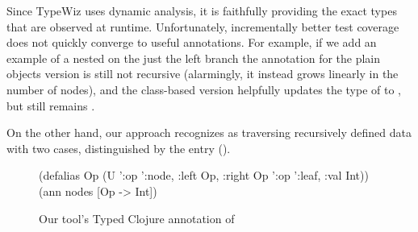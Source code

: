 Since TypeWiz uses dynamic analysis, it is faithfully
providing the exact types that are observed at runtime.
Unfortunately, incrementally better test coverage does not quickly converge
to useful annotations.
For example, if we add an example of a nested 
on the just the left branch
the annotation for the plain objects version is still not recursive (alarmingly, it instead
grows linearly in the number of nodes), and the class-based
version helpfully updates the type of  to ,
but  still remains .


%
%

On the other hand,
our approach recognizes  as traversing recursively defined
data with two cases, distinguished by the 
entry ().

\begin{figure}
\begin{cljlisting}
(defalias Op 
  (U '{:op ':node, :left Op, :right Op}
     '{:op ':leaf, :val Int}))
(ann nodes [Op -> Int])
\end{cljlisting}
  \caption{Our tool's Typed Clojure annotation of }
\label{fig:infer:nodestype}
\end{figure}

